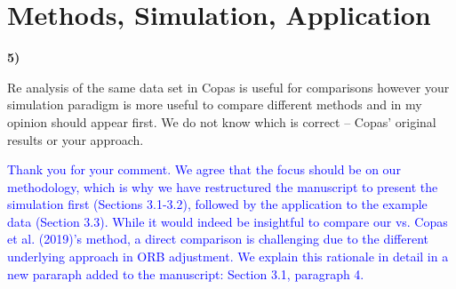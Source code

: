 \documentclass{article}
\begin{document}


\bigskip

\section*{Methods, Simulation, Application}

\textbf{5)}

\bigskip

Re analysis of the same data set in Copas is useful for comparisons however your simulation paradigm is more useful to compare different methods and in my opinion should appear first. We do not know which is correct – Copas’ original results or your approach.

\bigskip

\textcolor{blue}{Thank you for your comment. We agree that the focus should be on our methodology, which is why we have restructured the manuscript to present the simulation first (Sections 3.1-3.2), followed by the application to the example data (Section 3.3). While it would indeed be insightful to compare our vs. Copas et al. (2019)'s method, a direct comparison is challenging due to the different underlying approach in ORB adjustment. We explain this rationale in detail in a new pararaph added to the manuscript: Section 3.1, paragraph 4.}
\end{document}
